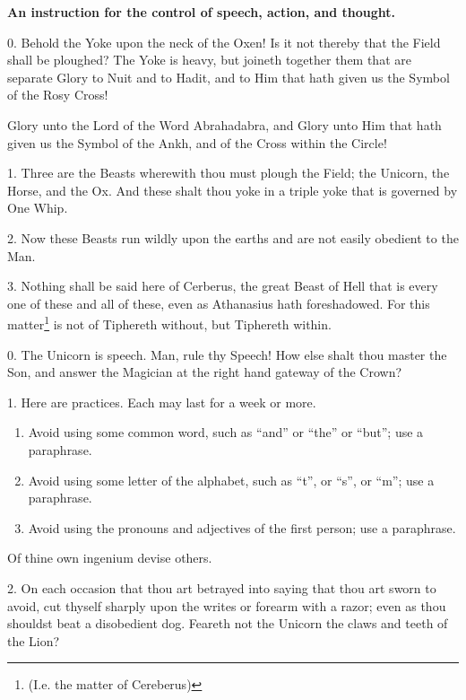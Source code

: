 
\textbf{An instruction for the control of speech, action, and thought.}

0. Behold the Yoke upon the neck of the Oxen! Is it not thereby that the Field shall be ploughed? The Yoke is heavy, but joineth together them that are separate \textemdash{} Glory to Nuit and to Hadit, and to Him that hath given us the Symbol of the Rosy Cross!

Glory unto the Lord of the Word Abrahadabra, and Glory unto Him that hath given us the Symbol of the Ankh, and of the Cross within the Circle!

1. Three are the Beasts wherewith thou must plough the Field; the Unicorn, the Horse, and the Ox. And these shalt thou yoke in a triple yoke that is governed by One Whip.

2. Now these Beasts run wildly upon the earths and are not easily obedient to the Man.

3. Nothing shall be said here of Cerberus, the great Beast of Hell that is every one of these and all of these, even as Athanasius hath foreshadowed. For this matter\footnote{(I.e. the matter of Cereberus)} is not of Tiphereth without, but Tiphereth within.

0. The Unicorn is speech. Man, rule thy Speech! How else shalt thou master the Son, and answer the Magician at the right hand gateway of the Crown?

1. Here are practices. Each may last for a week or more.
\begin{enumerate}[label=\greek*.]
\item Avoid using some common word, such as \enquote{and} or \enquote{the} or \enquote{but}; use a paraphrase.

\item Avoid using some letter of the alphabet, such as \enquote{t}, or \enquote{s}, or \enquote{m}; use a paraphrase.

\item Avoid using the pronouns and adjectives of the first person; use a paraphrase.
\end{enumerate}
Of thine own ingenium devise others.

2. On each occasion that thou art betrayed into saying that thou art sworn to avoid, cut thyself sharply upon the writes or forearm with a razor; even as thou shouldst beat a disobedient dog. Feareth not the Unicorn the claws and teeth of the Lion?

